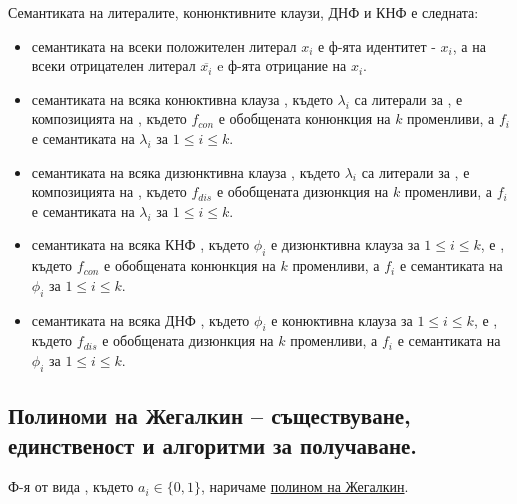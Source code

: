 \begin{note}
    Семантиката на литералите, конюнктивните клаузи, ДНФ и КНФ е следната:
    \begin{itemize}
        \item семантиката на всеки положителен литерал \(x_i\) е ф-ята идентитет - \(x_i\), а на всеки 
        отрицателен литерал \(\overline{x_i}\) e ф-ята отрицание на \(x_i\).
        \item семантиката на всяка конюктивна клауза , където 
        \(\lambda_i\) са литерали за , е композицията на , 
        където \(f_{con}\) е обобщената конюнкция на \(k\) променливи, а \(f_i\) е семантиката на \(\lambda_i\) за 
        \(1 \le i \le k\).
        \item семантиката на всяка дизюнктивна клауза , 
        където \(\lambda_i\) са литерали за , е композицията на 
        , където \(f_{dis}\) е обобщената дизюнкция на \(k\) променливи, 
        а \(f_i\) е семантиката на \(\lambda_i\) за \(1 \le i \le k\).
        \item семантиката на всяка КНФ , където 
        \(\phi_i\) е дизюнктивна клауза за \(1 \le i \le k\), е , където 
        \(f_{con}\) е обобщената конюнкция на \(k\) променливи, а \(f_i\) е семантиката на \(\phi_i\) за 
        \(1 \le i \le k\).
        \item семантиката на всяка ДНФ , където 
        \(\phi_i\) е конюктивна клауза за \(1 \le i \le k\), е , където 
        \(f_{dis}\) е обобщената дизюнкция на \(k\) променливи, а \(f_i\) е семантиката на \(\phi_i\) за 
        \(1 \le i \le k\).
    \end{itemize}
\end{note}

\subsection*{Полиноми на Жегалкин – съществуване, единственост и алгоритми за получаване.}

\begin{definition}
    Ф-я от вида , където 
    \(a_i \in \{0, 1\}\), наричаме \underline{полином на Жегалкин}.
\end{definition}

